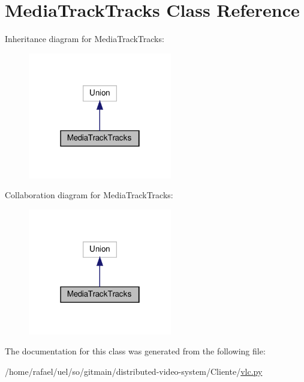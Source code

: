 \hypertarget{classvlc_1_1_media_track_tracks}{}\section{Media\+Track\+Tracks Class Reference}
\label{classvlc_1_1_media_track_tracks}


Inheritance diagram for Media\+Track\+Tracks\+:
\nopagebreak
\begin{figure}[H]
\begin{center}
\leavevmode
\includegraphics[width=178pt]{classvlc_1_1_media_track_tracks__inherit__graph}
\end{center}
\end{figure}


Collaboration diagram for Media\+Track\+Tracks\+:
\nopagebreak
\begin{figure}[H]
\begin{center}
\leavevmode
\includegraphics[width=178pt]{classvlc_1_1_media_track_tracks__coll__graph}
\end{center}
\end{figure}


The documentation for this class was generated from the following file\+:\begin{DoxyCompactItemize}
\item 
/home/rafael/uel/so/gitmain/distributed-\/video-\/system/\+Cliente/\hyperlink{vlc_8py}{vlc.\+py}\end{DoxyCompactItemize}
